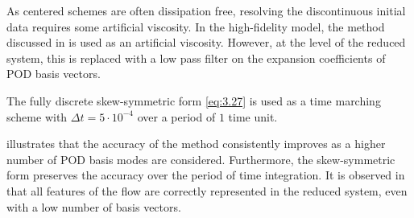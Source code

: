 As centered schemes are often dissipation free, resolving the discontinuous initial data requires some artificial viscosity. In the high-fidelity model, the method discussed in \cite{artificial_dissipation} is used as an artificial viscosity. However, at the level of the reduced system, this is replaced with a low pass filter on the expansion coefficients of POD basis vectors. 

The fully discrete skew-symmetric form \eqref{eq:3.27} is used as a time marching scheme with $\Delta t = 5 \cdot 10^{-4}$ over a period of $1$ time unit.

 illustrates that the accuracy of the method consistently improves as a higher number of POD basis modes are considered. Furthermore, the skew-symmetric form preserves the accuracy over the period of time integration. It is observed in  that all features of the flow are correctly represented in the reduced system, even with a low number of basis vectors.

